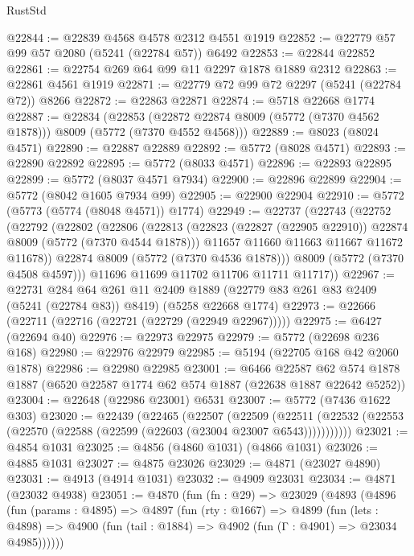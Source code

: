 \begin{lexlean}{RustStd}
\begin{coremodule}
@22844 := @22839 @4568 @4578 @2312 @4551 @1919
@22852 := @22779 @57 @99 @57 @2080 (@5241 (@22784 @57)) @6492
@22853 := @22844 @22852
@22861 := @22754 @269 @64 @99 @11 @2297 @1878 @1889 @2312
@22863 := @22861 @4561 @1919
@22871 := @22779 @72 @99 @72 @2297 (@5241 (@22784 @72)) @8266
@22872 := @22863 @22871
@22874 := @5718 @22668 @1774
@22887 := @22834
    (@22853 (@22872 @22874 @8009 (@5772 (@7370 @4562 @1878))) @8009 (@5772 (@7370 @4552 @4568)))
@22889 := @8023 (@8024 @4571)
@22890 := @22887 @22889
@22892 := @5772 (@8028 @4571)
@22893 := @22890 @22892
@22895 := @5772 (@8033 @4571)
@22896 := @22893 @22895
@22899 := @5772 (@8037 @4571 @7934)
@22900 := @22896 @22899
@22904 := @5772 (@8042 @1605 @7934 @99)
@22905 := @22900 @22904
@22910 := @5772 (@5773 (@5774 (@8048 @4571)) @1774)
@22949 := @22737
    (@22743
      (@22752
        (@22792
          (@22802
            (@22806
              (@22813
                (@22823 (@22827 (@22905 @22910)) @22874 @8009 (@5772 (@7370 @4544 @1878)))
                @11657
                @11660
                @11663
                @11667
                @11672
                @11678))
            @22874
            @8009
            (@5772 (@7370 @4536 @1878)))
          @8009
          (@5772 (@7370 @4508 @4597)))
        @11696
        @11699
        @11702
        @11706
        @11711
        @11717))
@22967 := @22731
    @284
    @64
    @261
    @11
    @2409
    @1889
    (@22779 @83 @261 @83 @2409 (@5241 (@22784 @83)) @8419)
    (@5258 @22668 @1774)
@22973 := @22666 (@22711 (@22716 (@22721 (@22729 (@22949 @22967)))))
@22975 := @6427 (@22694 @40)
@22976 := @22973 @22975
@22979 := @5772 (@22698 @236 @168)
@22980 := @22976 @22979
@22985 := @5194 (@22705 @168 @42 @2060 @1878)
@22986 := @22980 @22985
@23001 := @6466
    @22587
    @62
    @574
    @1878
    @1887
    (@6520 @22587 @1774 @62 @574 @1887 (@22638 @1887 @22642 @5252))
@23004 := @22648 (@22986 @23001) @6531
@23007 := @5772 (@7436 @1622 @303)
@23020 := @22439
    (@22465
      (@22507
        (@22509
          (@22511 (@22532 (@22553 (@22570 (@22588 (@22599 (@22603 (@23004 @23007 @6543)))))))))))
@23021 := @4854 @1031
@23025 := @4856 (@4860 @1031) (@4866 @1031)
@23026 := @4885 @1031
@23027 := @4875 @23026
@23029 := @4871 (@23027 @4890)
@23031 := @4913 (@4914 @1031)
@23032 := @4909 @23031
@23034 := @4871 (@23032 @4938)
@23051 := @4870
    (fun (fn : @29) =>
    @23029
      (@4893
        (@4896
          (fun (params : @4895) =>
          @4897
            (fun (rty : @1667) =>
            @4899
              (fun (lets : @4898) =>
              @4900 (fun (tail : @1884) => @4902 (fun (Γ : @4901) => @23034 @4985))))))

\end{coremodule}
\end{lexlean}
